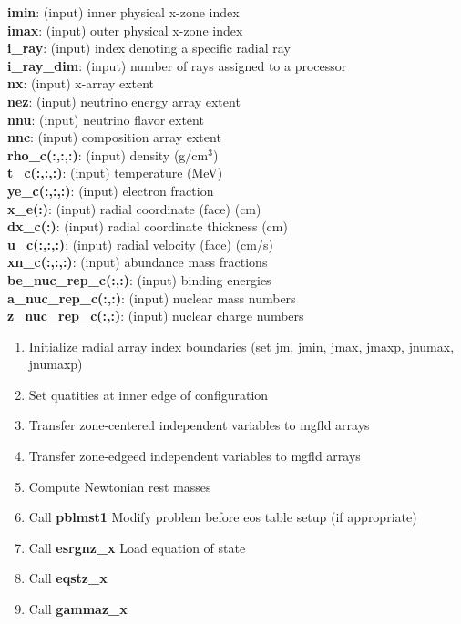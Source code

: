\documentclass[11pt,doublespace]{article}
\begin{document}
\begin{itemize}
\begin{enumerate}
\begin{enumerate}
\begin{enumerate}
   {\bf imin}: (input) inner physical x-zone index\\
   {\bf imax}: (input) outer physical x-zone index\\
   {\bf i\_ray}: (input) index denoting a specific radial ray\\
   {\bf i\_ray\_dim}: (input) number of rays assigned to a processor\\
   {\bf nx}: (input) x-array extent\\
   {\bf nez}: (input) neutrino energy array extent\\
   {\bf nnu}: (input) neutrino flavor extent\\
   {\bf nnc}: (input) composition array extent\\
   {\bf rho\_c(:,:,:)}: (input) density (g/cm$^{3}$)\\
   {\bf t\_c(:,:,:)}: (input) temperature (MeV)\\
   {\bf ye\_c(:,:,:)}: (input) electron fraction\\
   {\bf x\_e(:)}: (input) radial coordinate (face) (cm)\\
   {\bf dx\_c(:)}: (input) radial coordinate thickness (cm)\\
   {\bf u\_c(:,:,:)}: (input) radial velocity (face) (cm/s)\\
   {\bf xn\_c(:,:,:)}: (input) abundance mass fractions\\
   {\bf be\_nuc\_rep\_c(:,:)}: (input) binding energies\\
   {\bf a\_nuc\_rep\_c(:,:)}: (input) nuclear mass numbers\\
   {\bf z\_nuc\_rep\_c(:,:)}: (input) nuclear charge numbers
\begin{enumerate}
  \item Initialize radial array index boundaries (set jm, jmin, jmax, jmaxp, jnumax, jnumaxp)
  \item Set quatities at inner edge of configuration
  \item Transfer zone-centered independent variables to mgfld arrays
  \item Transfer zone-edgeed independent variables to mgfld arrays
  \item Compute Newtonian rest masses
  \item Call {\bf pblmst1} Modify problem before eos table setup (if appropriate)
  \item Call {\bf esrgnz_x} Load equation of state
  \item Call {\bf eqstz_x}
  \item Call {\bf gammaz_x}

\end{enumerate}
\end{enumerate}
\end{enumerate}
\end{enumerate}
\end{itemize}
\end{document}
